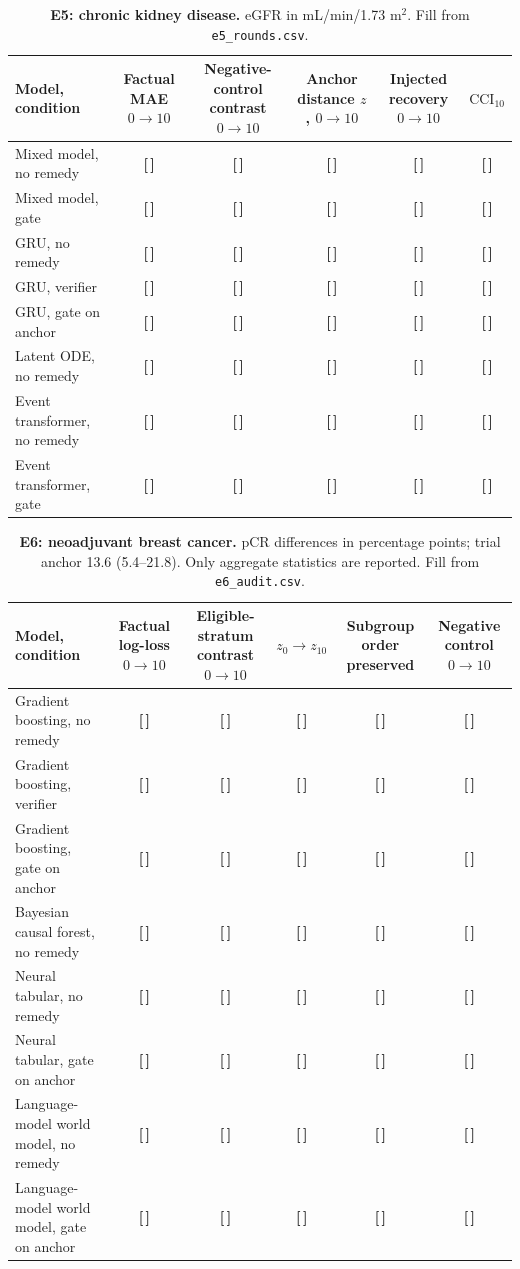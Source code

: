 \documentclass[11pt,a4paper]{article}
\newcommand{\T}{{\color{red}\textbf{[\,]}}}
\newcommand{\CCI}{\mathrm{CCI}}
\begin{document}
\FloatBarrier
\begin{table}[!htbp]\centering\footnotesize
\caption{\textbf{E5: chronic kidney disease.} eGFR in mL/min/1.73 m$^2$. Fill from \texttt{e5\_rounds.csv}.}
\begin{tabularx}{\textwidth}{@{}p{3.9cm} C C C C C@{}}\toprule
Model, condition & Factual MAE $0\to10$ & Negative-control contrast $0\to10$ & Anchor distance $z$, $0\to10$ & Injected recovery $0\to10$ & $\CCI_{10}$\\\midrule
Mixed model, no remedy & \T & \T & \T & \T & \T\\
Mixed model, gate & \T & \T & \T & \T & \T\\
GRU, no remedy & \T & \T & \T & \T & \T\\
GRU, verifier & \T & \T & \T & \T & \T\\
GRU, gate on anchor & \T & \T & \T & \T & \T\\
Latent ODE, no remedy & \T & \T & \T & \T & \T\\
Event transformer, no remedy & \T & \T & \T & \T & \T\\
Event transformer, gate & \T & \T & \T & \T & \T\\
\bottomrule\end{tabularx}
\end{table}
\FloatBarrier
\begin{table}[!htbp]\centering\footnotesize
\caption{\textbf{E6: neoadjuvant breast cancer.} pCR differences in percentage points; trial anchor 13.6 (5.4--21.8). Only aggregate statistics are reported. Fill from \texttt{e6\_audit.csv}.}
\begin{tabularx}{\textwidth}{@{}p{3.9cm} C C C C C@{}}\toprule
Model, condition & Factual log-loss $0\to10$ & Eligible-stratum contrast $0\to10$ & $z_0\to z_{10}$ & Subgroup order preserved & Negative control $0\to10$\\\midrule
Gradient boosting, no remedy & \T & \T & \T & \T & \T\\
Gradient boosting, verifier & \T & \T & \T & \T & \T\\
Gradient boosting, gate on anchor & \T & \T & \T & \T & \T\\
Bayesian causal forest, no remedy & \T & \T & \T & \T & \T\\
Neural tabular, no remedy & \T & \T & \T & \T & \T\\
Neural tabular, gate on anchor & \T & \T & \T & \T & \T\\
Language-model world model, no remedy & \T & \T & \T & \T & \T\\
Language-model world model, gate on anchor & \T & \T & \T & \T & \T\\
\bottomrule\end{tabularx}
\end{table}
\end{document}
